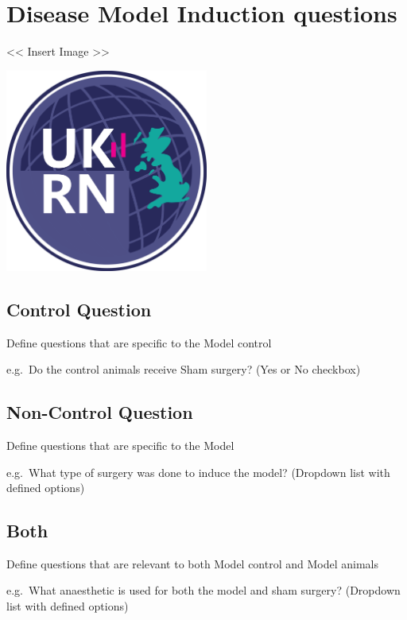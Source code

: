 \documentclass[]{book}
\begin{document}
\section{Disease Model Induction
questions}\label{disease-model-induction-questions}

\textless{}\textless{} Insert Image \textgreater{}\textgreater{}

\includegraphics[width=0.50000\textwidth,height=0.50000\textwidth]{figs/evidence-triangle.png}

\subsection{Control Question}\label{control-question}

Define questions that are specific to the Model control

e.g.~Do the control animals receive Sham surgery? (Yes or No checkbox)

\subsection{Non-Control Question}\label{non-control-question}

Define questions that are specific to the Model

e.g.~What type of surgery was done to induce the model? (Dropdown list
with defined options)

\subsection{Both}\label{both}

Define questions that are relevant to both Model control and Model
animals

e.g.~What anaesthetic is used for both the model and sham surgery?
(Dropdown list with defined options)
\end{document}

